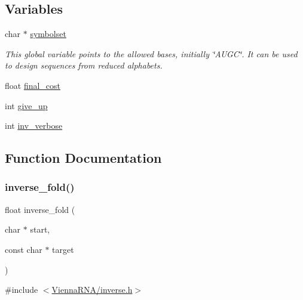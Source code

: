 \subsection*{Variables}
\begin{DoxyCompactItemize}
\item 
\mbox{\label{group__inverse__fold_ga8f791e7740a5a28b9f6fafb4e60301d9}} 
char $\ast$ \mbox{\hyperlink{group__inverse__fold_ga8f791e7740a5a28b9f6fafb4e60301d9}{symbolset}}
\begin{DoxyCompactList}\small\item\em This global variable points to the allowed bases, initially \char`\"{}\+A\+U\+G\+C\char`\"{}. It can be used to design sequences from reduced alphabets. \end{DoxyCompactList}\item 
float \mbox{\hyperlink{group__inverse__fold_ga7f17d3b169af048d32bb185039a9c09c}{final\+\_\+cost}}
\item 
int \mbox{\hyperlink{group__inverse__fold_ga7ec4ba51f86e1717a1e174264e4a75ce}{give\+\_\+up}}
\item 
int \mbox{\hyperlink{group__inverse__fold_gafcfc65fba01b9cca5946726ed9057a63}{inv\+\_\+verbose}}
\end{DoxyCompactItemize}


\subsection{Function Documentation}
\mbox{\label{group__inverse__fold_ga7af026de55d4babad879f2c92559cbbc}} 
\subsubsection{\texorpdfstring{inverse\_fold()}{inverse\_fold()}}
{\footnotesize\ttfamily float inverse\+\_\+fold (\begin{DoxyParamCaption}\item[{char $\ast$}]{start,  }\item[{const char $\ast$}]{target }\end{DoxyParamCaption})}



{\ttfamily \#include $<$\mbox{\hyperlink{inverse_8h}{Vienna\+R\+N\+A/inverse.\+h}}$>$}



